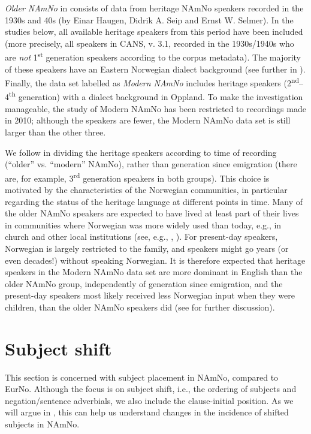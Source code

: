 \documentclass[output=paper]{langscibook}
\begin{document}
\textit{Older NAmNo} in  consists of data from heritage NAmNo speakers recorded in the 1930s and 40s (by Einar Haugen, Didrik A. Seip and Ernst W. Selmer). In the studies below, all available heritage speakers from this period have been included (more precisely, all speakers in CANS, v. 3.1, recorded in the 1930s/1940s who are \textit{not} 1\textsuperscript{st} generation speakers according to the corpus metadata). The majority of these speakers have an Eastern Norwegian dialect background (see further in \citealt{LarssonForthcoming}). Finally, the data set labelled as \textit{Modern NAmNo} includes heritage speakers (2\textsuperscript{nd}–4\textsuperscript{th} generation) with a dialect background in Oppland. To make the investigation manageable, the study of Modern NAmNo has been restricted to recordings made in 2010; although the speakers are fewer, the Modern NAmNo data set is still larger than the other three. 

We follow \citet{LarssonForthcoming} in dividing the heritage speakers according to time of recording (``older'' vs. ``modern'' NAmNo), rather than generation since emigration (there are, for example, 3\textsuperscript{rd} generation speakers in both groups). This choice is motivated by the characteristics of the Norwegian communities, in particular regarding the status of the heritage language at different points in time. Many of the older NAmNo speakers are expected to have lived at least part of their lives in communities where Norwegian was more widely used than today, e.g., in church and other local institutions (see, e.g., \citealt{Natvig2022, EideHjelde2023}, ). For present-day speakers, Norwegian is largely restricted to the family, and speakers might go years (or even decades!) without speaking Norwegian. It is therefore expected that heritage speakers in the Modern NAmNo data set are more dominant in English than the older NAmNo group, independently of generation since emigration, and the present-day speakers most likely received less Norwegian input when they were children, than the older NAmNo speakers did (see \citealt{LarssonForthcoming} for further discussion). 

\section{Subject shift}\label{sec:larsson:3}

This section is concerned with subject placement in NAmNo, compared to EurNo. Although the focus is on subject shift, i.e., the ordering of subjects and negation/sentence adverbials, we also include the clause-initial position. As we will argue in , this can help us understand changes in the incidence of shifted subjects in NAmNo. 
\end{document}
